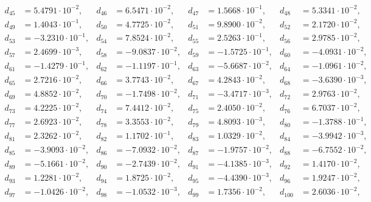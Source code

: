 \begin{align*}
d_{ 45 } &= 5.4791 \cdot 10^{ -2 }, & d_{ 46 } &= 6.5471 \cdot 10^{ -2 }, & d_{ 47 } &= 1.5668 \cdot 10^{ -1 }, & d_{ 48 } &= 5.3341 \cdot 10^{ -2 },\\ 
d_{ 49 } &= 1.4043 \cdot 10^{ -1 }, & d_{ 50 } &= 4.7725 \cdot 10^{ -2 }, & d_{ 51 } &= 9.8900 \cdot 10^{ -2 }, & d_{ 52 } &= 2.1720 \cdot 10^{ -2 },\\ 
d_{ 53 } &= -3.2310 \cdot 10^{ -1 }, & d_{ 54 } &= 7.8524 \cdot 10^{ -2 }, & d_{ 55 } &= 2.5263 \cdot 10^{ -1 }, & d_{ 56 } &= 2.9785 \cdot 10^{ -2 },\\ 
d_{ 57 } &= 2.4699 \cdot 10^{ -3 }, & d_{ 58 } &= -9.0837 \cdot 10^{ -2 }, & d_{ 59 } &= -1.5725 \cdot 10^{ -1 }, & d_{ 60 } &= -4.0931 \cdot 10^{ -2 },\\ 
d_{ 61 } &= -1.4279 \cdot 10^{ -1 }, & d_{ 62 } &= -1.1197 \cdot 10^{ -1 }, & d_{ 63 } &= -5.6687 \cdot 10^{ -2 }, & d_{ 64 } &= -1.0961 \cdot 10^{ -2 },\\ 
d_{ 65 } &= 2.7216 \cdot 10^{ -2 }, & d_{ 66 } &= 3.7743 \cdot 10^{ -2 }, & d_{ 67 } &= 4.2843 \cdot 10^{ -2 }, & d_{ 68 } &= -3.6390 \cdot 10^{ -3 },\\ 
d_{ 69 } &= 4.8852 \cdot 10^{ -2 }, & d_{ 70 } &= -1.7498 \cdot 10^{ -2 }, & d_{ 71 } &= -3.4717 \cdot 10^{ -3 }, & d_{ 72 } &= 2.9763 \cdot 10^{ -2 },\\ 
d_{ 73 } &= 4.2225 \cdot 10^{ -2 }, & d_{ 74 } &= 7.4412 \cdot 10^{ -2 }, & d_{ 75 } &= 2.4050 \cdot 10^{ -2 }, & d_{ 76 } &= 6.7037 \cdot 10^{ -2 },\\ 
d_{ 77 } &= 2.6923 \cdot 10^{ -2 }, & d_{ 78 } &= 3.3553 \cdot 10^{ -2 }, & d_{ 79 } &= 4.8093 \cdot 10^{ -3 }, & d_{ 80 } &= -1.3788 \cdot 10^{ -1 },\\ 
d_{ 81 } &= 2.3262 \cdot 10^{ -2 }, & d_{ 82 } &= 1.1702 \cdot 10^{ -1 }, & d_{ 83 } &= 1.0329 \cdot 10^{ -2 }, & d_{ 84 } &= -3.9942 \cdot 10^{ -3 },\\ 
d_{ 85 } &= -3.9093 \cdot 10^{ -2 }, & d_{ 86 } &= -7.0932 \cdot 10^{ -2 }, & d_{ 87 } &= -1.9757 \cdot 10^{ -2 }, & d_{ 88 } &= -6.7552 \cdot 10^{ -2 },\\ 
d_{ 89 } &= -5.1661 \cdot 10^{ -2 }, & d_{ 90 } &= -2.7439 \cdot 10^{ -2 }, & d_{ 91 } &= -4.1385 \cdot 10^{ -3 }, & d_{ 92 } &= 1.4170 \cdot 10^{ -2 },\\ 
d_{ 93 } &= 1.2281 \cdot 10^{ -2 }, & d_{ 94 } &= 1.8725 \cdot 10^{ -2 }, & d_{ 95 } &= -4.4390 \cdot 10^{ -3 }, & d_{ 96 } &= 1.9247 \cdot 10^{ -2 },\\ 
d_{ 97 } &= -1.0426 \cdot 10^{ -2 }, & d_{ 98 } &= -1.0532 \cdot 10^{ -3 }, & d_{ 99 } &= 1.7356 \cdot 10^{ -2 }, & d_{ 100 } &= 2.6036 \cdot 10^{ -2 }, 
\end{align*}

